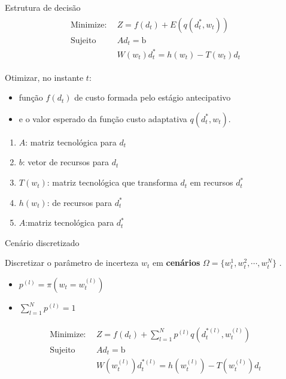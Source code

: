 \documentclass{beamer}
\begin{document}
\begin{frame}{Estrutura de decisão}
\begin{equation}
\begin{array}{cc}
\left. \begin{aligned}
\text{Minimize:} \ \ &Z = f(d_t)  + E\left(q(d_t^{*},w_t)\right) \ \\
\text{Sujeito} \ \ & A d_t = \text{b} \\
& W(w_t)d_t^{*} = h(w_t) - T(w_t)d_t
 \end{aligned}\right.
\end{array}
\label{eq:fob}
\end{equation}


Otimizar, no instante $t$:
\begin{itemize}
\item  função $f(d_t)$ de custo formada pelo estágio antecipativo
\item e o valor esperado da função custo adaptativa $q(d_t^{*},w_t)$.
\end{itemize}
 
\pause 

\begin{enumerate}
\item  $A$: matriz tecnológica para $d_t$ 
\item $b$: vetor de recursos  para $d_t$ 
\item $T(w_t)$: matriz tecnológica que transforma $d_t$ em recursos $d_t^{*}$
\item $h(w_t)$: de recursos para $d_t^{*}$
\item $A$:matriz tecnológica para $d_t^{*}$
\end{enumerate}








\end{frame}



\begin{frame}{Cenário discretizado}

Discretizar o parâmetro de incerteza $w_t$ em \textbf{cenários}  $\Omega = \{w_t^{1},w_t^{2},\cdots,w_t^{N}\}$ \citep{Kouwenberg2008}.
\begin{itemize}
\item $p^{(l)} = \pi(w_t = w_t^{(l)})$
\item $\sum_{l=1}^N p^{(l)} = 1$
\end{itemize}

\begin{equation}
\begin{array}{cc}
\left. \begin{aligned}
\text{Minimize:} \ \ &Z = f(d_t)  +\sum_{l=1}^N p^{(l)} q(d_t^{*(l)},w_t^{(l)}) \ \\
\text{Sujeito} \ \ & A d_t = \text{b} \\
& W(w_t^{(l)})d_t^{*(l)} = h(w_t^{(l)}) - T(w_t^{(l)})d_t
 \end{aligned}\right.
\end{array}
\label{eq:fobc}
\end{equation}


\end{frame}
\end{document}
